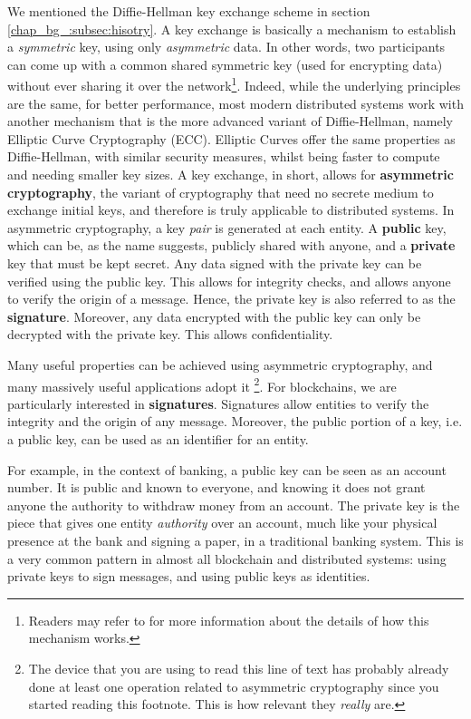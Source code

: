 We mentioned the Diffie-Hellman key exchange scheme in section \ref{chap_bg_:subsec:hisotry}. A key
exchange is basically a mechanism to establish a \textit{symmetric} key, using only
\textit{asymmetric} data. In other words, two participants can come up with a common shared
symmetric key (used for encrypting data) without ever sharing it over the network\footnote{Readers
may refer to \cite{diffieNewDirectionsCryptography1976} for more information about the details of
how this mechanism works.}. Indeed, while the underlying principles are the same, for better
performance, most modern distributed systems work with another mechanism that is the more advanced
variant of Diffie-Hellman, namely Elliptic Curve Cryptography (ECC). Elliptic Curves offer the same
properties as Diffie-Hellman, with similar security measures, whilst being faster to compute and
needing smaller key sizes. A key exchange, in short, allows for \textbf{asymmetric cryptography},
the variant of cryptography that need no secrete medium to exchange initial keys, and therefore is
truly applicable to distributed systems. In asymmetric cryptography, a key \textit{pair} is
generated at each entity. A \textbf{public} key, which can be, as the name suggests, publicly shared
with anyone, and a \textbf{private} key that must be kept secret. Any data signed with the private
key can be verified using the public key. This allows for integrity checks, and allows anyone to
verify the origin of a message. Hence, the private key is also referred to as the
\textbf{signature}. Moreover, any data encrypted with the public key can only be decrypted with the
private key. This allows confidentiality.

Many useful properties can be achieved using asymmetric cryptography, and many massively useful
applications adopt it \footnote{The device that you are using to read this line of text has probably
already done at least one operation related to asymmetric cryptography since you started reading
this footnote. This is how relevant they \textit{really} are.}. For blockchains, we are particularly
interested in \textbf{signatures}. Signatures allow entities to verify the integrity and the origin
of any message. Moreover, the public portion of a key, i.e. a public key, can be used as an
identifier for an entity.

For example, in the context of banking, a public key can be seen as an account number. It is public
and known to everyone, and knowing it does not grant anyone the authority to withdraw money from an
account. The private key is the piece that gives one entity \textit{authority} over an account, much
like your physical presence at the bank and signing a paper, in a traditional banking system. This
is a very common pattern in almost all blockchain and distributed systems: using private keys to
sign messages, and using public keys as identities.

